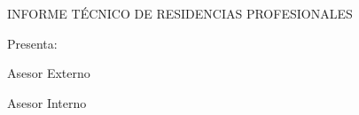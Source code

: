 \begin{titlepage}
\begin{center}
\begin{minipage}{0.25\textwidth}
\begin{flushright}
            \end{flushright}
        \end{minipage}
        
        \vspace{1.3cm}
        \MakeUppercase{Informe técnico de residencias profesionales}

        \nombreProyecto{}

        \vspace{1.3cm}
        \fechaInicioResidencia\fechaFinResidencia{}

        \nombreEmpresa{}

        \vspace{1.3cm}
        Presenta:

        \nombreAutor{}

        \numeroControl{}

        \especialidad{}

        \vspace{1.3cm}
        Asesor Externo

        \nombreAsesorExterno{}

        \vspace{1.3cm}
        Asesor Interno

        \nombreAsesorInterno{}

        \vspace{1.3cm}
        \fechaPresentacion{}
    \end{center}
    
\end{titlepage}
\restoregeometry{}